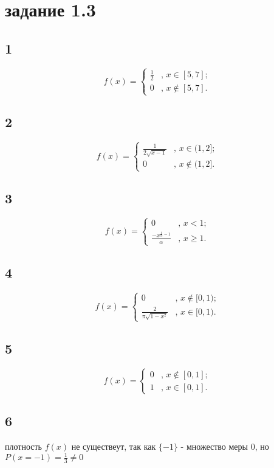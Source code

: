 \documentclass[a4paper]{article}
\begin{document}
	\section*{задание 1.3}
	\begin{large}
		\subsection*{1}
		\[ f(x) = \left\{ \begin{array}{ll}
			\frac{1}{2} & \mbox{, $x \in [5, 7]$};\\
			0 & \mbox{, $x \notin [5,7]$}.\end{array} \right. \]
		\subsection*{2}
		\[ f(x) = \left\{ \begin{array}{ll}
			\frac{1}{2\sqrt{x-1}} & \mbox{, $x \in (1, 2]$};\\
			0 & \mbox{, $x \notin (1, 2]$}.\end{array} \right. \]
		\subsection*{3}
		\[ f(x) = \left\{ \begin{array}{ll}
			0 & \mbox{, $x<1$};\\
			\frac{-x^{\frac{1}{\alpha}-1}}{\alpha} & \mbox{, $x\ge 1$}.\end{array} \right. \]
		\subsection*{4}
		\[ f(x) = \left\{ \begin{array}{ll}
			0 & \mbox{, $x \notin [0,1)$};\\
			\frac{2}{\pi \sqrt{1-x^2}} & \mbox{, $x \in [0,1)$}.\end{array} \right. \]
		\subsection*{5}
		\[ f(x) = \left\{ \begin{array}{ll}
			0 & \mbox{, $x \notin [0,1]$};\\
			1 & \mbox{, $x \in [0,1]$}.\end{array} \right. \]
		\subsection*{6}
		плотность $f(x)$ не существеут, так как $\lbrace-1\rbrace$ - множество меры $0$, но $P(x=-1)=\frac{1}{3}\ne 0$\\
	\end{large}
\end{document}
